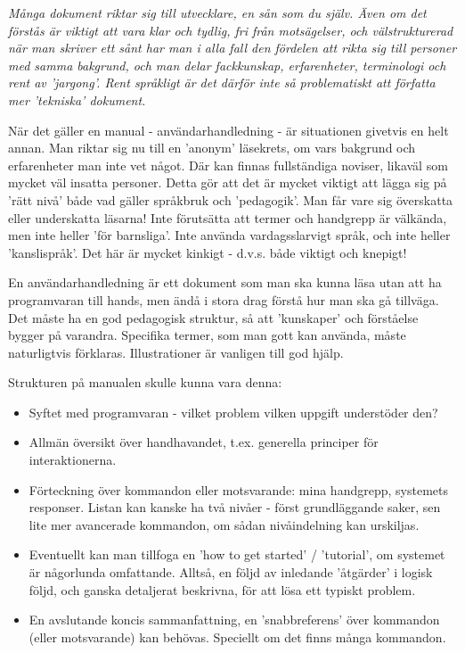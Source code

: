  \em Många dokument riktar sig till utvecklare, en sån som du själv. Även om det förstås är viktigt att vara klar och tydlig, fri från motsägelser, och välstrukturerad när man skriver ett sånt har man i alla fall den fördelen att rikta sig till personer med samma bakgrund, och man delar fackkunskap, erfarenheter, terminologi och rent av 'jargong'. Rent språkligt är det därför inte så problematiskt att författa mer 'tekniska' dokument.

När det gäller en manual - användarhandledning - är situationen givetvis en helt annan. Man riktar sig nu till en 'anonym' läsekrets, om vars bakgrund och erfarenheter man inte vet något. Där kan finnas fullständiga noviser, likaväl som mycket väl insatta personer. Detta gör att det är mycket viktigt att lägga sig på 'rätt nivå' både vad gäller språkbruk och 'pedagogik'. Man får vare sig överskatta eller underskatta läsarna! Inte förutsätta att termer och handgrepp är välkända, men inte heller 'för barnsliga'. Inte använda vardagsslarvigt språk, och inte heller 'kanslispråk'. Det här är mycket kinkigt - d.v.s. både viktigt och knepigt!

En användarhandledning är ett dokument som man ska kunna läsa utan att ha programvaran till hands, men ändå i stora drag förstå hur man ska gå tillväga. Det måste ha en god pedagogisk struktur, så att 'kunskaper' och förståelse bygger på varandra. Specifika termer, som man gott kan använda, måste naturligtvis förklaras. Illustrationer är vanligen till god hjälp.

Strukturen på manualen skulle kunna vara denna:

\begin{itemize}
\item Syftet med programvaran - vilket problem vilken uppgift understöder den?
\item Allmän översikt över handhavandet, t.ex. generella principer för interaktionerna.
\item Förteckning över kommandon eller motsvarande: mina handgrepp, systemets responser. Listan kan kanske ha två nivåer - först grundläggande saker, sen lite mer avancerade kommandon, om sådan nivåindelning kan urskiljas.
\item Eventuellt kan man tillfoga en 'how to get started' / 'tutorial', om systemet är någorlunda omfattande. Alltså, en följd av inledande 'åtgärder' i logisk följd, och ganska detaljerat beskrivna, för att lösa ett typiskt problem.
\item En avslutande koncis sammanfattning, en 'snabbreferens' över kommandon (eller motsvarande) kan behövas. Speciellt om det finns många kommandon.
\end{itemize}
\em

